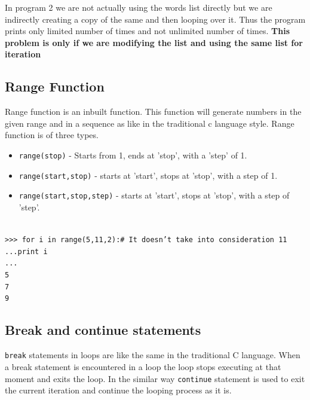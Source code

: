 \documentclass[12pt,a4paper]{article}
\begin{document}
In program 2 we are not actually using the words list directly but we are indirectly creating a copy of the same and then looping over it. Thus the program prints only limited number of times and not unlimited number of times. \textbf{This problem is only if we are modifying the list and using the same list for iteration}

\subsection{Range Function}
Range function is an inbuilt function. This function will generate numbers in the given range and in a sequence as like in the traditional c language style. Range function is of three types.\\
\begin{itemize}
\item \texttt{range(stop)} - Starts from 1, ends at 'stop', with a 'step' of 1.
\item \texttt{range(start,stop)} - starts at 'start', stops at 'stop', with a step of 1.
\item \texttt{range(start,stop,step)} - starts at 'start', stops at 'stop', with a step of 'step'.
\end{itemize}

\texttt{
\\
>>> for i in range(5,11,2):\# It doesn't take into consideration 11\\
...\hspace{30pt}print i\\
...\\
5\\
7\\
9\\}

\subsection{Break and continue statements}
\texttt{break} statements in loops are like the same in the traditional C language. When a break statement is encountered in a loop the loop stops executing at that moment and exits the loop. In the similar way \texttt{continue} statement is used to exit the current iteration and continue the looping process as it is.
\end{document}
